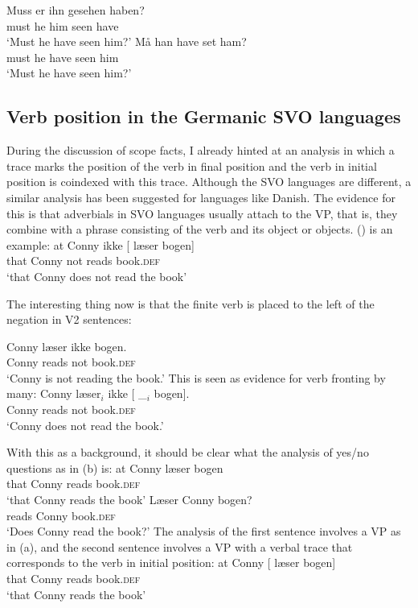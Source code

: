 \eal
\ex 
\gll Muss er ihn gesehen haben?\\
     must he him seen have\\
\glt `Must he have seen him?'
\ex 
\gll Må han have set ham?\\
     must he have seen him\\
\glt `Must he have seen him?'
\zl





\subsection{Verb position in the Germanic SVO languages}
\label{sec-danish-verb-movement}\label{sec-Germanic-SVO-verb-position}

During the discussion of scope facts, I already hinted at an analysis in which a trace marks the
position of the verb in final position and the verb in initial position is coindexed with this
trace. Although the SVO languages are different, a similar analysis has been suggested for languages
like Danish. The evidence for this is that adverbials in SVO languages usually attach to the VP,
that is, they combine with a phrase consisting of the verb and its object or objects. () is
an example:
\ea
\gll  at   Conny ikke [ læser bogen]\\
      that Conny not      {}        reads          book.\textsc{def}\\
\glt `that Conny does not read the book'
\z

The interesting thing now is that the finite verb is placed to the left of the negation in V2 sentences:

\ea
\gll  Conny læser ikke bogen.\\
       Conny reads   not  book.\textsc{def}\\
\glt `Conny is not reading the book.'
\z
This is seen as evidence for verb fronting by many:
\ea
\gll  Conny læser$_i$ ikke [ \_$_i$ bogen].\\
      Conny reads      not  {} {}    book.\textsc{def}\\
\glt `Conny does not read the book.'
\z
\nocite{KS2002a}

With this as a background, it should be clear what the analysis of yes/no questions as in (b) is:
\eal
\ex
\gll at Conny læser bogen\\
     that Conny reads book.\textsc{def}\\
\glt `that Conny reads the book'
\ex\label{ex-laeser-jens-bogen}
\gll Læser Conny bogen?\\
     reads Conny book.\textsc{def}\\
\glt `Does Conny read the book?'
\zl
The analysis of the first sentence involves a VP as in (a), and the second sentence involves a
VP with a verbal trace that corresponds to the verb in initial position:
\eal
\ex
\gll at Conny [ læser bogen]\\
     that Conny {} reads book.\textsc{def}\\
\glt `that Conny reads the book'

